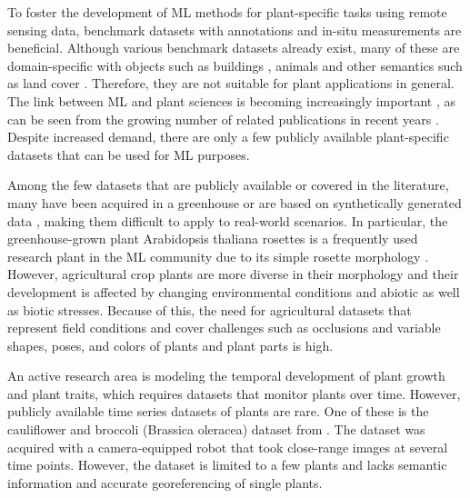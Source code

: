 \documentclass{article}
\begin{document}
To foster the development of ML methods for plant-specific tasks using remote sensing data, benchmark datasets with annotations and in-situ measurements are beneficial.
Although various benchmark datasets already exist, many of these are domain-specific with objects such as buildings \citep{roscher2020semcity}, animals \citep{deng2009imagenet} and other semantics such as land cover \citep{cordts2015cityscapes}.
Therefore, they are not suitable for plant applications in general. The link between ML and plant sciences is becoming increasingly important \citep{lary2016machine}, as can be seen from the growing number of related publications in recent years \citep{chebrolu2017agricultural,forster2019hyperspectral,kierdorf2019detection,zabawa2019detection,halstead2020fruit,ahmadi2021virtual}. Despite increased demand, there are only a few publicly available plant-specific datasets that can be used for ML purposes. 

Among the few datasets that are publicly available or covered in the literature, many have been acquired in a greenhouse \citep{scharr2014annotated,minervini2016finely,murecsan2017fruit,halstead2020fruit} or are based on synthetically generated data \citep{ward2018synthetic,kierdorf2022behind}, making them difficult to apply to real-world scenarios.
In particular, the greenhouse-grown plant Arabidopsis thaliana rosettes is a frequently used research plant in the ML community due to its simple rosette morphology \citep{scharr2014annotated}.
However, agricultural crop plants are more diverse in their morphology and their development is affected by changing environmental conditions and abiotic as well as biotic stresses. Because of this, the need for agricultural datasets that represent field conditions and cover challenges such as occlusions and variable shapes, poses, and colors of plants and plant parts is high.

An active research area is modeling the temporal development of plant growth and plant traits, which requires datasets that monitor plants over time. However, publicly available time series datasets of plants are rare. 
One of these is the cauliflower and broccoli (Brassica oleracea) dataset from \cite{bender2020high}. The dataset was acquired with a camera-equipped robot that took close-range images at several time points. However, the dataset is limited to a few plants and lacks semantic information and accurate georeferencing of single plants.
\end{document}
